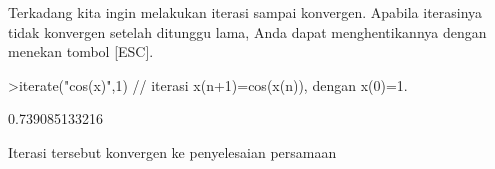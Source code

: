 \documentclass[a4paper,10pt]{article}
\begin{document}
\begin{eulernotebook}
\begin{eulercomment}
\begin{eulercomment}
\begin{eulercomment}
\begin{eulercomment}
\begin{eulercomment}
\begin{eulercomment}
\begin{eulercomment}
Terkadang kita ingin melakukan iterasi sampai konvergen. Apabila iterasinya tidak konvergen
setelah ditunggu lama, Anda dapat menghentikannya dengan menekan tombol [ESC].
\end{eulercomment}
\begin{eulerprompt}
>iterate("cos(x)",1) // iterasi x(n+1)=cos(x(n)), dengan x(0)=1.
\end{eulerprompt}
\begin{euleroutput}
  0.739085133216
\end{euleroutput}
\begin{eulercomment}
Iterasi tersebut konvergen ke penyelesaian persamaan


\end{eulercomment}
\end{eulercomment}
\end{eulercomment}
\end{eulercomment}
\end{eulercomment}
\end{eulercomment}
\end{eulercomment}
\end{eulernotebook}
\end{document}
